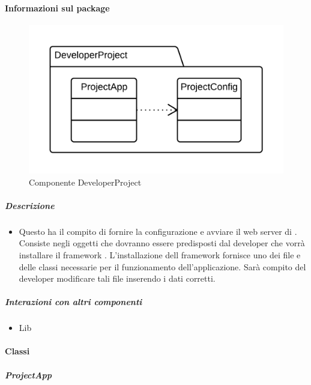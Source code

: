   \paragraph{Informazioni sul package} 
    \begin{figure}[H] 
      \begin{center} 
        \includegraphics[width=\textwidth]{uml/package/Back-end::DeveloperProject.png}  
        \caption{Componente DeveloperProject}
      \end{center}  
    \end{figure} 
  \subparagraph{Descrizione} 
    \begin{itemize}
    \item[] Questo  ha il compito di fornire la configurazione e avviare il web server di . Consiste negli oggetti che dovranno essere predisposti dal developer che vorrà installare il framework . L'installazione dell framework  fornisce uno  dei file e delle classi necessarie per il funzionamento dell'applicazione. Sarà compito del developer modificare tali file inserendo i dati corretti.
    \end{itemize} 
  \subparagraph{Interazioni con altri componenti} 
    \begin{itemize} 
        \item Lib  
    \end{itemize} 
    \paragraph{Classi}
      \subparagraph{ProjectApp}
        
